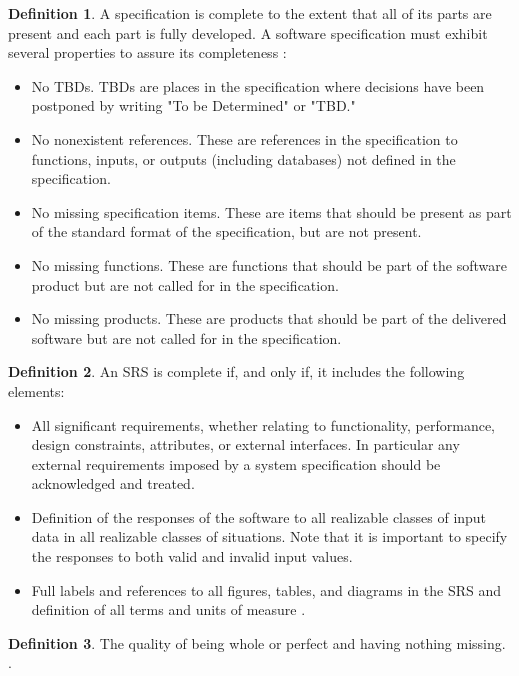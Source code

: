 \documentclass[letterpaper, cleveref]{lipics-v2019}
\theoremstyle{definition}
\newtheorem{defn}{Definition}
\begin{document}
\begin{defn}
  \label{CompletenessSelected} A specification is complete to the extent
  that all of its parts are present and each part is fully developed. A
  software specification must exhibit several properties to assure its
  completeness \citep{Boehm1984}:
  \begin{itemize}
  \item No TBDs. TBDs are places in the specification where decisions have been
    postponed by writing "To be Determined" or "TBD."
  \item No nonexistent references. These are references in the specification to
    functions, inputs, or outputs (including databases) not defined in the
    specification.
  \item No missing specification items. These are items that should be present
    as part of the standard format of the specification, but are not present.
  \item No missing functions. These are functions that should be part of the
    software product but are not called for in the specification.
  \item No missing products. These are products that should be part of the
    delivered software but are not called for in the specification.
  \end{itemize}
\end{defn}

\begin{defn}
	An SRS is complete if, and only if, it includes the following elements:
\begin{itemize}
\item All significant requirements, whether relating to functionality,
performance, design constraints, attributes, or external interfaces. In
particular any external requirements imposed by a system specification should be
acknowledged and treated.
\item Definition of the responses of the software to all realizable classes of
input data in all realizable classes of situations. Note that it is important to
specify the responses to both valid and invalid input values.
\item Full labels and references to all figures, tables, and diagrams in the SRS
and definition of all terms and units of measure \citep{IEEE1998}.
	\end{itemize}
\end{defn}

\begin{defn}
The quality of being whole or perfect and having nothing missing.
\citep{CambridgeCompleteness2019}.
\end{defn}
\end{document}
